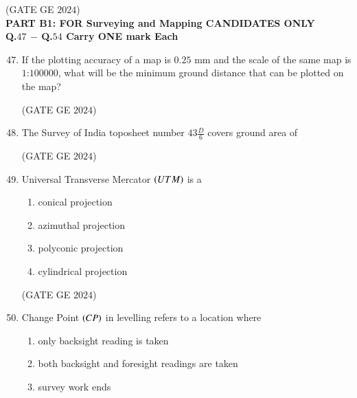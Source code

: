 \documentclass[journal,12pt,onecolumn]{IEEEtran}
\theoremstyle{remark}
\begin{document}
\hfill{(GATE GE $2024$)}
\bigskip
\\
\textbf{PART B1: FOR Surveying and Mapping CANDIDATES ONLY}\\

\textbf{Q.$47$ $-$ Q.$54$ Carry ONE mark Each}\\
\begin{enumerate}
\setcounter{enumi}{46}
\item If the plotting accuracy of a map is $0.25$ mm and the scale of the same map is $1$:$100000$, what will be the minimum ground distance that can be plotted on the map?
\begin{enumerate}
\end{enumerate}
\hfill{(GATE GE $2024$)}
\bigskip
\item The Survey of India toposheet number $43\frac{D}{6}$ covers ground area of
\begin{enumerate}
\end{enumerate}
\hfill{(GATE GE $2024$)}
\bigskip
\item Universal Transverse Mercator $\left(UTM\right)$ is a
\begin{enumerate}
\item conical projection
\item azimuthal projection
\item polyconic projection
\item cylindrical projection
\end{enumerate}
\hfill{(GATE GE $2024$)}
\bigskip
\item Change Point $\left(CP\right)$ in levelling refers to a location where
\begin{enumerate}
\item only backsight reading is taken
\item both backsight and foresight readings are taken
\item survey work ends

\end{enumerate}
\end{enumerate}
\end{document}
